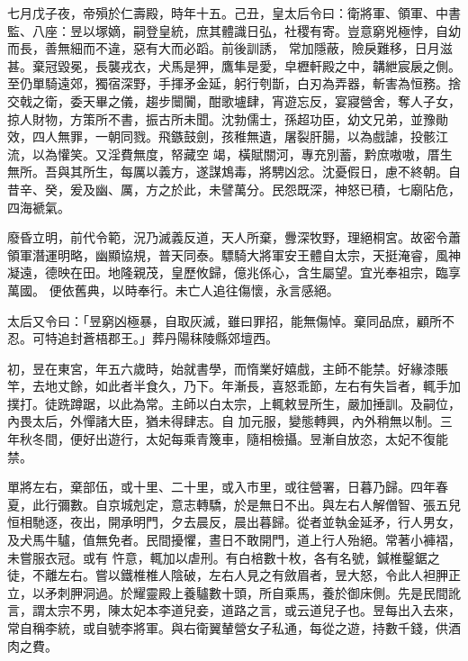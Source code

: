 \begin{pinyinscope}
 七月戊子夜，帝殞於仁壽殿，時年十五。己丑，皇太后令曰：衛將軍、領軍、中書監、八座：昱以塚嫡，嗣登皇統，庶其體識日弘，社稷有寄。豈意窮兇極悖，自幼而長，善無細而不違，惡有大而必蹈。前後訓誘，
 常加隱蔽，險戾難移，日月滋甚。棄冠毀冕，長襲戎衣，犬馬是狎，鷹隼是愛，皁櫪軒殿之中，韝紲宸扆之側。至仍單騎遠郊，獨宿深野，手揮矛金延，躬行刳斮，白刃為弄器，斬害為恒務。捨交戟之衛，委天畢之儀，趨步闤闠，酣歌壚肆，宵遊忘反，宴寢營舍，奪人子女，掠人財物，方策所不書，振古所未聞。沈勃儒士，孫超功臣，幼文兄弟，並豫勛效，四人無罪，一朝同戮。飛鏃鼓劍，孩稚無遺，屠裂肝腸，以為戲謔，投骸江流，以為懽笑。又淫費無度，帑藏空
 竭，橫賦關河，專充別蓄，黔庶嗷嗷，厝生無所。吾與其所生，每厲以義方，遂謀鴆毒，將騁凶忿。沈憂假日，慮不終朝。自昔辛、癸，爰及幽、厲，方之於此，未譬萬分。民怨既深，神怒已積，七廟阽危，四海褫氣。



 廢昏立明，前代令範，況乃滅義反道，天人所棄，釁深牧野，理絕桐宮。故密令蕭領軍潛運明略，幽顯協規，普天同泰。驃騎大將軍安王體自太宗，天挺淹睿，風神凝遠，德映在田。地隆親茂，皇歷攸歸，億兆係心，含生屬望。宜光奉祖宗，臨享萬國。
 便依舊典，以時奉行。未亡人追往傷懷，永言感絕。



 太后又令曰：「昱窮凶極暴，自取灰滅，雖曰罪招，能無傷悼。棄同品庶，顧所不忍。可特追封蒼梧郡王。」葬丹陽秣陵縣郊壇西。



 初，昱在東宮，年五六歲時，始就書學，而惰業好嬉戲，主師不能禁。好緣漆賬竿，去地丈餘，如此者半食久，乃下。年漸長，喜怒乖節，左右有失旨者，輒手加撲打。徒跣蹲踞，以此為常。主師以白太宗，上輒敕昱所生，嚴加捶訓。及嗣位，內畏太后，外憚諸大臣，猶未得肆志。自
 加元服，變態轉興，內外稍無以制。三年秋冬間，便好出遊行，太妃每乘青篾車，隨相檢攝。昱漸自放恣，太妃不復能禁。



 單將左右，棄部伍，或十里、二十里，或入市里，或往營署，日暮乃歸。四年春夏，此行彌數。自京城剋定，意志轉驕，於是無日不出。與左右人解僧智、張五兒恒相馳逐，夜出，開承明門，夕去晨反，晨出暮歸。從者並執金延矛，行人男女，及犬馬牛驢，值無免者。民間擾懼，晝日不敢開門，道上行人殆絕。常著小褲褶，未嘗服衣冠。或有
 忤意，輒加以虐刑。有白棓數十枚，各有名號，鍼椎鑿鋸之徒，不離左右。嘗以鐵椎椎人陰破，左右人見之有斂眉者，昱大怒，令此人袒胛正立，以矛刺胛洞過。於耀靈殿上養驢數十頭，所自乘馬，養於御床側。先是民間訛言，謂太宗不男，陳太妃本李道兒妾，道路之言，或云道兒子也。昱每出入去來，常自稱李統，或自號李將軍。與右衛翼輦營女子私通，每從之遊，持數千錢，供酒肉之費。




\end{pinyinscope}
